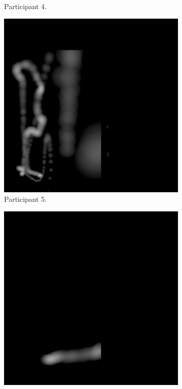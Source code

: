 \begin{figure}[!ht]
\begin{subfigure}[b]{0.24\textwidth}
        \caption{Participant 4.}
    \end{subfigure}
    \hfill
    \begin{subfigure}[b]{0.24\textwidth}
        \centering
        \includegraphics[width=\textwidth]{img/data/Panel17/single/5.png}
        \caption{Participant 5.}
    \end{subfigure}
    \hfill    
    \begin{subfigure}[b]{0.24\textwidth}
        \centering
        \includegraphics[width=\textwidth]{img/data/Panel17/single/6.png}

\end{subfigure}
\end{figure}
